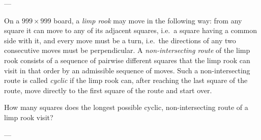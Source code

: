 
---

On a $999\times999$ board, a \emph{limp rook} may move in the following way: from any square it can move to any of its adjacent squares, i.e.\ a square having a common side with it, and every move must be a turn, i.e.\ the directions of any two consecutive moves must be perpendicular. A \emph{non-intersecting route} of the limp rook consists of a sequence of pairwise different squares that the limp rook can visit in that order by an admissible sequence of moves. Such a non-intersecting route is called \emph{cyclic} if the limp rook can, after reaching the last square of the route, move directly to the first square of the route and start over.

How many squares does the longest possible cyclic, non-intersecting route of a limp rook visit?

---


